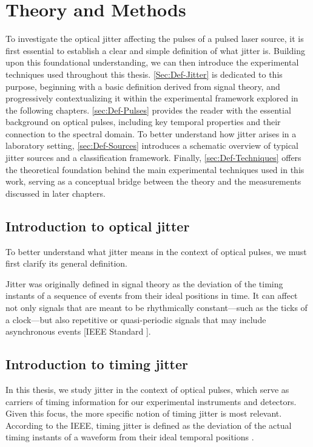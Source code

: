 \chapter{Theory and Methods}
To investigate the optical jitter affecting the pulses of a pulsed laser source, it is first essential to establish a clear and simple definition of what jitter is. Building upon this foundational understanding, we can then introduce the experimental techniques used throughout this thesis.
\autoref{Sec:Def-Jitter} is dedicated to this purpose, beginning with a basic definition derived from signal theory, and progressively contextualizing it within the experimental framework explored in the following chapters.
\autoref{sec:Def-Pulses} provides the reader with the essential background on optical pulses, including key temporal properties and their connection to the spectral domain.
To better understand how jitter arises in a laboratory setting, \autoref{sec:Def-Sources} introduces a schematic overview of typical jitter sources and a classification framework.
Finally, \autoref{sec:Def-Techniques} offers the theoretical foundation behind the main experimental techniques used in this work, serving as a conceptual bridge between the theory and the measurements discussed in later chapters.



\section{Introduction to optical jitter}
\label{Sec:Def-Jitter}

To better understand what jitter means in the context of optical pulses, we must first clarify its general definition.

Jitter was originally defined in signal theory as the deviation of the timing instants 
of a sequence of events from their ideal positions in time.
It can affect not only signals that are meant to be rhythmically constant—such as the ticks of a 
clock—but also repetitive or quasi-periodic signals that may include asynchronous events [IEEE Standard \cite{General_IEEE}].

\section{Introduction to timing jitter}
In this thesis, we study jitter in the context of optical pulses, which serve as carriers of timing information
 for our experimental instruments and detectors. Given this focus, the more specific notion of timing jitter is most relevant.
According to the IEEE, timing jitter is defined as the deviation of 
the actual timing instants of a waveform from their ideal temporal positions \cite{General_IEEE}.

